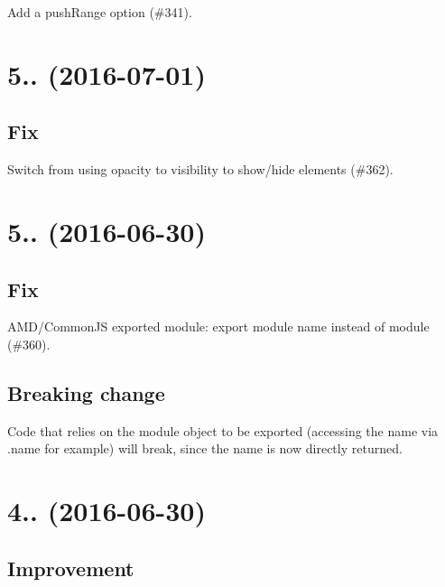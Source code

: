 \begin{DoxyItemize}
\item Add a {\ttfamily push\+Range} option (\#341).
\end{DoxyItemize}

\section*{5.. (2016-\/07-\/01)}

\subsection*{Fix}


\begin{DoxyItemize}
\item Switch from using opacity to visibility to show/hide elements (\#362).
\end{DoxyItemize}

\section*{5.. (2016-\/06-\/30)}

\subsection*{Fix}


\begin{DoxyItemize}
\item A\+M\+D/\+Common\+JS exported module\+: export module name instead of module (\#360).
\end{DoxyItemize}

\subsection*{Breaking change}

Code that relies on the module object to be exported (accessing the name via .name for example) will break, since the name is now directly returned.

\section*{4.. (2016-\/06-\/30)}

\subsection*{Improvement}


